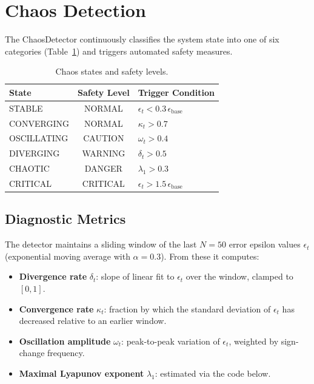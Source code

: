 \section{Chaos Detection}

The ChaosDetector continuously classifies the system state into one of
six categories (Table~\ref{tab:chaos_states}) and triggers automated safety
measures.

\begin{table}[htbp]
\centering
\caption{Chaos states and safety levels.}
\label{tab:chaos_states}
\begin{tabular}{l c p{5cm}}
\toprule
\textbf{State} & \textbf{Safety Level} & \textbf{Trigger Condition} \\
\midrule
STABLE        & NORMAL    & $\epsilon_t < 0.3\,\epsilon_{\text{base}}$ \\
CONVERGING    & NORMAL    & $\kappa_t > 0.7$ \\
OSCILLATING   & CAUTION   & $\omega_t > 0.4$ \\
DIVERGING     & WARNING   & $\delta_t > 0.5$ \\
CHAOTIC       & DANGER    & $\lambda_1 > 0.3$ \\
CRITICAL      & CRITICAL  & $\epsilon_t > 1.5\,\epsilon_{\text{base}}$ \\
\bottomrule
\end{tabular}
\end{table}

\subsection{Diagnostic Metrics}

The detector maintains a sliding window of the last $N=50$ error epsilon
values $\epsilon_t$ (exponential moving average with $\alpha=0.3$).  From
these it computes:

\begin{itemize}
    \item \textbf{Divergence rate} $\delta_t$: slope of linear fit to $\epsilon_t$ over the window, clamped to $[0,1]$.
    \item \textbf{Convergence rate} $\kappa_t$: fraction by which the standard deviation of $\epsilon_t$ has decreased relative to an earlier window.
    \item \textbf{Oscillation amplitude} $\omega_t$: peak-to-peak variation of $\epsilon_t$, weighted by sign-change frequency.
    \item \textbf{Maximal Lyapunov exponent} $\lambda_1$: estimated via the code below.
\end{itemize}

